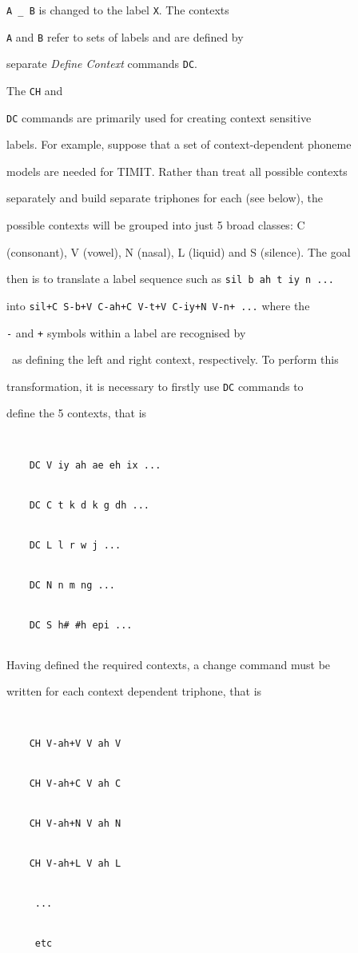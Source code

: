 \texttt{A \_ B} is changed to the label \texttt{X}.  The contexts


\texttt{A} and \texttt{B} refer to sets of labels and  are defined by


separate \textit{Define Context} commands \texttt{DC}.   


The \texttt{CH} and


\texttt{DC} commands are primarily used for creating context sensitive


labels.  For example, suppose that a set of context-dependent phoneme


models are needed for TIMIT.  Rather than treat all possible contexts


separately and build separate triphones for each  (see below), the


possible contexts  will be grouped into just 5 broad classes: C


(consonant), V (vowel), N (nasal), L (liquid) and S (silence). The goal


then is to translate a label sequence such as \texttt{sil b ah t iy n ...}


into \texttt{sil+C S-b+V C-ah+C V-t+V C-iy+N V-n+ ...} where the


\texttt{-} and \texttt{+} symbols within a label are recognised by 


\HTK\ as defining the left and right context, respectively. To perform this


transformation, it is necessary to firstly use \texttt{DC} commands to


define the 5 contexts, that is


\begin{verbatim}


    DC V iy ah ae eh ix ... 


    DC C t k d k g dh ... 


    DC L l r w j ...


    DC N n m ng ...


    DC S h# #h epi ...


\end{verbatim}


Having defined the required contexts, a change command must be


written for each context dependent triphone, that is


\begin{verbatim}


    CH V-ah+V V ah V


    CH V-ah+C V ah C


    CH V-ah+N V ah N


    CH V-ah+L V ah L


     ...


     etc


\end{verbatim}


